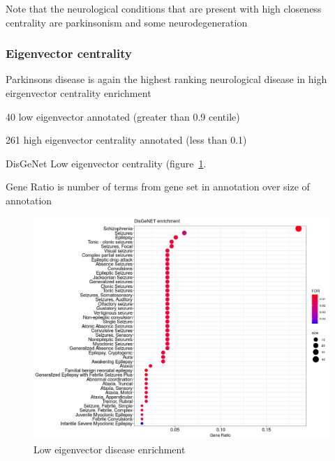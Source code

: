 Note that the neurological conditions that are present with high closeness centrality are parkinsonism and some neurodegeneration


\subsubsection{Eigenvector centrality}

Parkinsons disease is again the highest ranking neurological disease in high eirgenvector centrality enrichment

40 low eigenvector annotated (greater than 0.9 centile)

261 high eigenvector centrality annotated (less than 0.1)


DisGeNet Low eigenvector centrality (figure~\ref{fig:low eigenvector disease enrichment cut off 0.05}.

Gene Ratio is number of terms from gene set in annotation over size of annotation

\begin{figure}
    \centering
    \includegraphics[width=\textwidth]{images/Rplot_low_eigenctror_centrality.png}
    \caption{Low eigenvector disease enrichment}
    \label{fig:low eigenvector disease enrichment cut off 0.05}
\end{figure}


